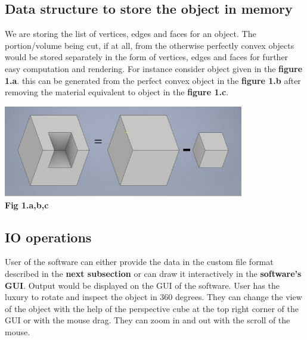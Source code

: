 \subsection{Data structure to store the object in memory}
We are storing the list of vertices, edges and faces for an object. The portion/volume being cut, if at all, from the otherwise perfectly convex objects would be stored separately in the form of vertices, edges and faces for further easy computation and rendering. For instance consider object given in the \textbf{figure 1.a}. this can be generated from the perfect convex object in the \textbf{figure 1.b} after removing the material equivalent to object in the \textbf{figure 1.c}.  
\begin {center}
	\includegraphics[height = 4cm]{fig1.png}\\
    \textbf{Fig 1.a,b,c}
\end {center}
\subsection{IO operations}
User of the software can either provide the data in the custom file format described in the \textbf{next subsection} or can draw it interactively in the \textbf{software's GUI}. Output would be displayed on the GUI of the software. User has the luxury to rotate and inspect the object in 360 degrees. They can change the view of the object with the help of the perspective cube at the top right corner of the GUI or with the mouse drag. They can zoom in and out with the scroll of the mouse. 

